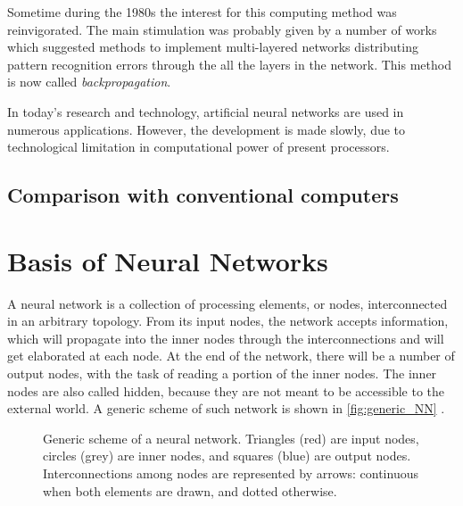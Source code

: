 Sometime during the 1980s the interest for this computing method was reinvigorated.
The main stimulation was probably given by a number of works which suggested methods to implement multi-layered networks distributing pattern recognition errors through the all the layers in the network.
This method is now called \textit{backpropagation}.

In today's research and technology, artificial neural networks are used in numerous applications.
However, the development is made slowly, due to technological limitation in computational power of present processors.

\subsection{Comparison with conventional computers}
\label{ssec:Comparison_with_conventional_computers}


\section{Basis of Neural Networks}
\label{sec:Basis_of_Neural_Networks}

A neural network is a collection of processing elements, or nodes, interconnected in an arbitrary topology.
From its input nodes, the network accepts information, which will propagate into the inner nodes through the interconnections and will get elaborated at each node.
At the end of the network, there will be a number of output nodes, with the task of reading a portion of the inner nodes.
The inner nodes are also called hidden, because they are not meant to be accessible to the external world.
A generic scheme of such network is shown in \autoref{fig:generic_NN} .

\begin{figure}[ht]
	\centering
	
	\caption{	Generic scheme of a neural network. %
						Triangles (red) are input nodes, circles (grey) are inner nodes, and squares (blue) are output nodes. %
						Interconnections among nodes are represented by arrows: %
						continuous when both elements are drawn, and dotted otherwise.
						}
	\label{fig:generic_NN}
\end{figure}

